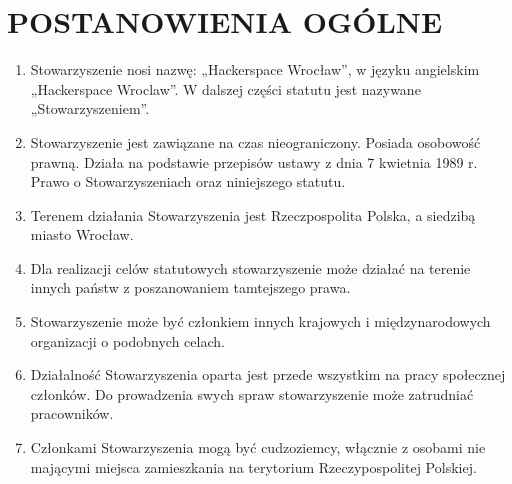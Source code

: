 \documentclass{article}
\begin{document}
\section{POSTANOWIENIA OGÓLNE}
  \begin{enumerate}
    \item Stowarzyszenie nosi nazwę: „Hackerspace Wrocław”, w języku angielskim „Hackerspace Wroclaw”. W dalszej części statutu jest nazywane „Stowarzyszeniem”.
    \item Stowarzyszenie jest zawiązane na czas nieograniczony. Posiada osobowość prawną. Działa na podstawie przepisów ustawy z dnia 7 kwietnia 1989 r. Prawo o Stowarzyszeniach oraz niniejszego statutu.
    \item Terenem działania Stowarzyszenia jest Rzeczpospolita Polska, a siedzibą miasto Wrocław.
    \item Dla realizacji celów statutowych stowarzyszenie może działać na terenie innych państw z poszanowaniem tamtejszego prawa.
    \item Stowarzyszenie może być członkiem innych krajowych i międzynarodowych organizacji o podobnych celach.
    \item Działalność Stowarzyszenia oparta jest przede wszystkim na pracy społecznej członków. Do prowadzenia swych spraw stowarzyszenie może zatrudniać pracowników.
    \item Członkami Stowarzyszenia mogą być cudzoziemcy, włącznie z osobami nie mającymi miejsca zamieszkania na terytorium Rzeczypospolitej Polskiej.
  \end{enumerate}
\end{document}
